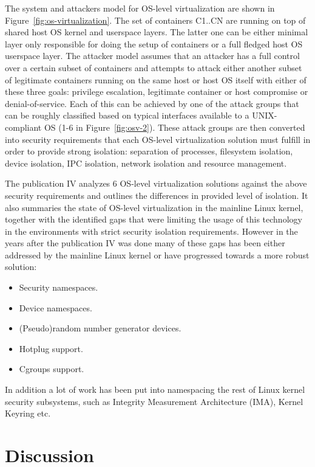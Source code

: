 The system and attackers model for OS-level virtualization are shown in Figure~\ref{fig:os-virtualization}. The set of containers C1..CN are running on top of shared host OS kernel and userspace layers. The latter one can be either minimal layer only responsible for doing the setup of containers or a full fledged host OS userspace layer. The attacker model assumes that an attacker has a full control over a certain subset of containers and attempts to attack either another subset of legitimate containers running on the same host or host OS itself with either of these three goals: privilege escalation, legitimate container or host compromise or denial-of-service. Each of this can be achieved by one of the attack groups that can be roughly classified based on typical interfaces available to a UNIX-compliant OS (1-6 in Figure~\ref{fig:osv-2}). These attack groups are then converted into security requirements that each OS-level virtualization solution must fulfill in order to provide strong isolation: separation of processes, filesystem isolation, device isolation, IPC isolation, network isolation and resource management.   

The publication IV analyzes 6 OS-level virtualization solutions against the above security requirements and outlines the differences in provided level of isolation. It also summaries the state of OS-level virtualization in the mainline Linux kernel, together with the identified gaps that were limiting the usage of this technology in the environments with strict security isolation requirements. However in the years after the publication IV was done many of these gaps has been either addressed by the mainline Linux kernel or have progressed towards a more robust solution:

\begin{itemize}
	\item Security namespaces. 
	\item Device namespaces.
	\item (Pseudo)random number generator devices. 
	\item Hotplug support. 
	\item Cgroups support. 
\end{itemize}

In addition a lot of work has been put into namespacing the rest of Linux kernel security subsystems, such as Integrity Measurement Architecture (IMA), Kernel Keyring etc.

\section{Discussion}

